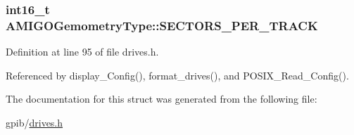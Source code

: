 \subsubsection[{\texorpdfstring{S\+E\+C\+T\+O\+R\+S\+\_\+\+P\+E\+R\+\_\+\+T\+R\+A\+CK}{SECTORS_PER_TRACK}}]{\setlength{\rightskip}{0pt plus 5cm}int16\+\_\+t A\+M\+I\+G\+O\+Gemometry\+Type\+::\+S\+E\+C\+T\+O\+R\+S\+\_\+\+P\+E\+R\+\_\+\+T\+R\+A\+CK}\hypertarget{structAMIGOGemometryType_a9ac647c76bd331ab5b1fd22a4f5b9a4a}{}\label{structAMIGOGemometryType_a9ac647c76bd331ab5b1fd22a4f5b9a4a}


Definition at line 95 of file drives.\+h.



Referenced by display\+\_\+\+Config(), format\+\_\+drives(), and P\+O\+S\+I\+X\+\_\+\+Read\+\_\+\+Config().



The documentation for this struct was generated from the following file\+:\begin{DoxyCompactItemize}
\item 
gpib/\hyperlink{drives_8h}{drives.\+h}\end{DoxyCompactItemize}
